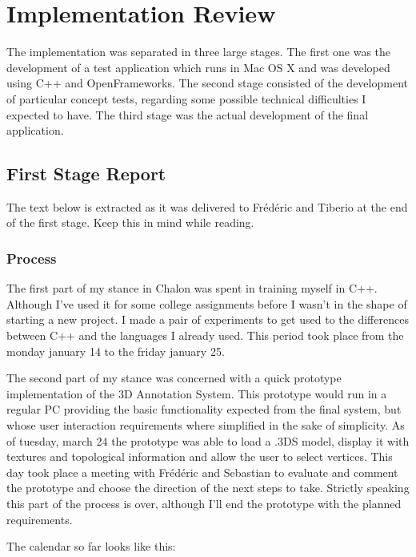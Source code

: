 \section{Implementation Review}
The implementation was separated in three large stages. The first one was the development of a test application which runs in Mac OS X and was developed using C++ and OpenFrameworks. The second stage consisted of the development of particular concept tests, regarding some possible technical difficulties I expected to have. The third stage was the actual development of the final application.

\subsection{First Stage Report}
The text below is extracted as it was delivered to Frédéric and Tiberio at the end of the first stage. Keep this in mind while reading.

\subsubsection{Process}
The first part of my stance in Chalon was spent in training myself in C++. Although I've used it for some college assignments before I wasn't in the shape of starting a new project. I made a pair of experiments to get used to the differences between C++ and the languages I already used. This period took place from the monday january 14 to the friday january 25.

The second part of my stance was concerned with a quick prototype implementation of the 3D Annotation System. This prototype would run in a regular PC providing the basic functionality expected from the final system, but whose user interaction requirements where simplified in the sake of simplicity. As of tuesday, march 24 the prototype was able to load a .3DS model, display it with textures and topological information and allow the user to select vertices. This day took place a meeting with Frédéric and Sebastian to evaluate and comment the prototype and choose the direction of the next steps to take. Strictly speaking this part of the process is over, although I'll end the prototype with the planned requirements.

The calendar so far looks like this:

